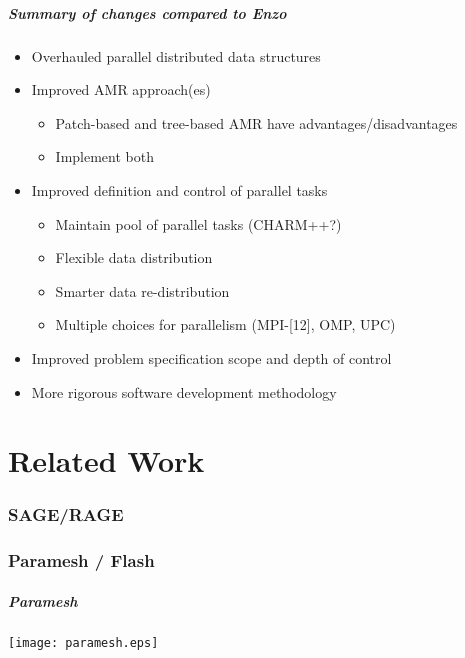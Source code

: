 \documentclass{beamer}
\newcommand{\enzo}{\textsf{Enzo}}
\begin{document}
\begin{frame}
\frametitle{Summary of changes compared to \enzo}
\begin{itemize}
\item Overhauled parallel distributed data structures
\item Improved AMR approach(es)
\begin{itemize}
\item  Patch-based and tree-based AMR have advantages/disadvantages
\item  Implement both
\end{itemize}
\item Improved definition and control of parallel tasks
\begin{itemize}
\item Maintain pool of parallel tasks (CHARM++?)
\item Flexible data distribution
\item Smarter  data re-distribution
\item Multiple choices for parallelism (MPI-[12], OMP, UPC)
\end{itemize}
\item Improved problem specification scope and depth of control
\item More rigorous software development methodology
\end{itemize}

\end{frame}

\part{Related Work}

\section{SAGE/RAGE}

\section{Paramesh / Flash}

\begin{frame}
\frametitle{Paramesh}
\centerline{\texttt{[image: paramesh.eps]}}
\end{frame}
\end{document}
